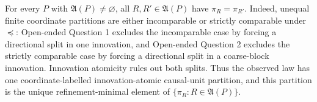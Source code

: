 For every \(P\) with \(\mathfrak A(P)\neq\varnothing\), all \(R,R'\in\mathfrak A(P)\) have \(\pi_R=\pi_{R'}\). Indeed, unequal finite coordinate partitions are either incomparable or strictly comparable under \(\preceq\): Open-ended Question 1 excludes the incomparable case by forcing a directional split in one innovation, and Open-ended Question 2 excludes the strictly comparable case by forcing a directional split in a coarse-block innovation. Innovation atomicity rules out both splits. Thus the observed law has one coordinate-labelled innovation-atomic causal-unit partition, and this partition is the unique refinement-minimal element of \(\{\pi_R:R\in\mathfrak A(P)\}\).